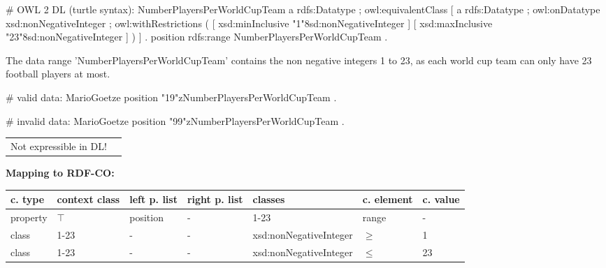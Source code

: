 \documentclass{llncs}
\newcommand{\ms}[1]{\texttt{#1}}
\newenvironment{gcotable}{
  \scriptsize
  \sffamily
  \vspace{0cm}
	\begin{center}
	\textbf{\vspace{0.4cm}Mapping to RDF-CO:} \\
  \begin{tabular}{l|l|l|l|l|l|l}
	\hline
  \textbf{c. type} & \textbf{context class} & \textbf{left p. list} & \textbf{right p. list} & \textbf{classes} & \textbf{c. element} & \textbf{c. value} \\
  \hline

}{
  \hline
  \end{tabular}
	\end{center}
}
\newenvironment{DL}{
  \vspace{0cm}
	\begin{center}
  \begin{tabular}{r l}

}{
  \end{tabular}
	\end{center}
}
\begin{document}
\begin{ex}
# OWL 2 DL (turtle syntax):
NumberPlayersPerWorldCupTeam
    a rdfs:Datatype ;
    owl:equivalentClass [
        a rdfs:Datatype ;
        owl:onDatatype xsd:nonNegativeInteger ;
        owl:withRestrictions ( 
            [ xsd:minInclusive "1"^^xsd:nonNegativeInteger ]
            [ xsd:maxInclusive "23"^^xsd:nonNegativeInteger ] ) ] .
position rdfs:range NumberPlayersPerWorldCupTeam .
\end{ex}

The data range 'NumberPlayersPerWorldCupTeam' contains the non negative integers 1 to 23, as each world cup team can only have 23 football players at most.

\begin{ex}
# valid data:
MarioGoetze
    position "19"^^:NumberPlayersPerWorldCupTeam .
\end{ex}

\begin{ex}
# invalid data:
MarioGoetze
    position "99"^^:NumberPlayersPerWorldCupTeam .
\end{ex}



\begin{DL}
Not expressible in DL!
\end{DL}

%

\begin{gcotable}
property & $\top$ & position & - & 1-23 & range & - \\
class & 1-23 & - & - & xsd:nonNegativeInteger & $\geq$ & 1 \\
class & 1-23 & - & - & xsd:nonNegativeInteger & $\leq$ & 23 \\
\end{gcotable}
\end{document}
